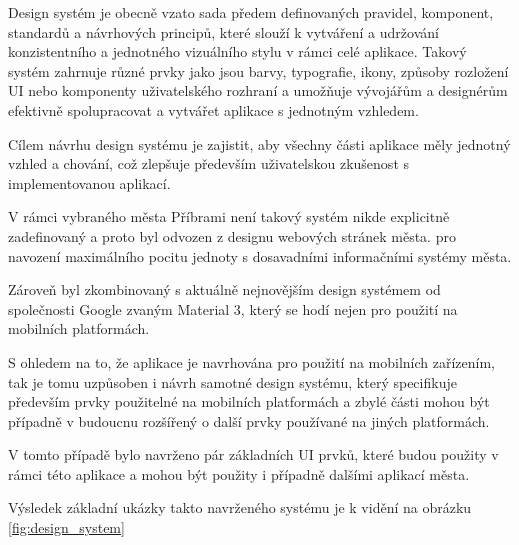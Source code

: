 Design systém je obecně vzato sada předem definovaných pravidel, komponent, standardů a návrhových principů, které slouží k vytváření a udržování 
konzistentního a jednotného vizuálního stylu v rámci celé aplikace. Takový systém zahrnuje různé prvky jako jsou barvy, typografie, ikony,
způsoby rozložení UI nebo komponenty uživatelského rozhraní a umožňuje vývojářům a designérům efektivně spolupracovat a vytvářet aplikace s jednotným 
vzhledem. 
 
Cílem návrhu design systému je zajistit, aby všechny části aplikace měly jednotný vzhled a chování, což zlepšuje především uživatelskou 
zkušenost s implementovanou aplikací. 



V rámci vybraného města Příbrami není takový systém nikde explicitně zadefinovaný a proto byl odvozen z designu webových stránek města.
pro navození maximálního pocitu jednoty s dosavadními informačními systémy města.

Zároveň byl zkombinovaný s aktuálně nejnovějším design systémem od společnosti Google zvaným Material 3, který se hodí nejen pro použití
na mobilních platformách.

S ohledem na to, že aplikace je navrhována pro použití na mobilních zařízením, tak je tomu uzpůsoben i návrh samotné design systému, který
specifikuje především prvky použitelné na mobilních platformách a zbylé části mohou být případně v budoucnu rozšířený o další prvky 
používané na jiných platformách.

V tomto případě bylo navrženo pár základních UI prvků, které budou použity v rámci této aplikace a mohou být použity i případně dalšími 
aplikací města.

Výsledek základní ukázky takto navrženého systému je k vidění na obrázku \ref{fig:design_system}

